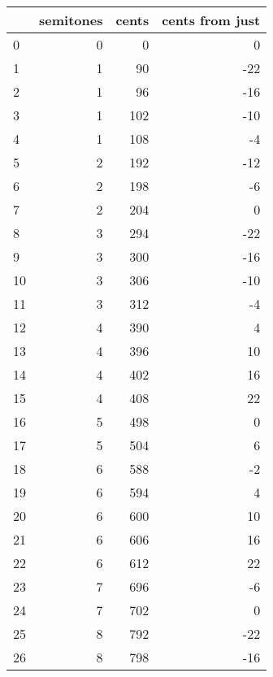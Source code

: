 \begin{singlespace}
\begin{table}[H]
\centering
\small
\begin{tabular}{|lrrr|}
\hline
\textbf{{}} & \textbf{ semitones} & \textbf{ cents} & \textbf{ cents from just }\\
\hline
0  &          0 &      0 &                0 \\
1  &          1 &     90 &              -22 \\
2  &          1 &     96 &              -16 \\
3  &          1 &    102 &              -10 \\
4  &          1 &    108 &               -4 \\
5  &          2 &    192 &              -12 \\
6  &          2 &    198 &               -6 \\
7  &          2 &    204 &                0 \\
8  &          3 &    294 &              -22 \\
9  &          3 &    300 &              -16 \\
10 &          3 &    306 &              -10 \\
11 &          3 &    312 &               -4 \\
12 &          4 &    390 &                4 \\
13 &          4 &    396 &               10 \\
14 &          4 &    402 &               16 \\
15 &          4 &    408 &               22 \\
16 &          5 &    498 &                0 \\
17 &          5 &    504 &                6 \\
18 &          6 &    588 &               -2 \\
19 &          6 &    594 &                4 \\
20 &          6 &    600 &               10 \\
21 &          6 &    606 &               16 \\
22 &          6 &    612 &               22 \\
23 &          7 &    696 &               -6 \\
24 &          7 &    702 &                0 \\
25 &          8 &    792 &              -22 \\
26 &          8 &    798 &              -16 \\

\end{tabular}
\end{table}
\end{singlespace}
